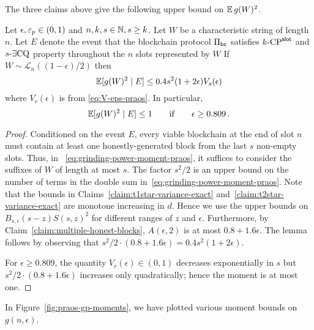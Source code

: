 The three claims above give the following upper bound on $\operatorname{\mathbb{E}} g(W)^2$.


\begin{lemma}\label{lemma:grinding-praos-second-moment}
  Let $\epsilon, \mathsf{\varepsilon}_p \in (0, 1)$ and $n, k, s \in \mathbb{N}, s \geq k$. 
  Let $W$ be a characteristic string of length $n$. 
  Let $E$ denote the event that 
  the blockchain protocol $\Pi_\mathsf{bc}$ 
  satisfies ${k}\text{-}\mathrm{CP}^{\mathsf{slot}}$ and ${s}\text{-}\exists\mathrm{CQ}$ property throughout 
  the $n$ slots represented by $W$   
  If $W  \sim \mathcal{L}_n((1 - \epsilon)/2)$ then
  \begin{equation}\label{eq:grinding-praos-second-moment}
    \operatorname{\mathbb{E}}[ g(W)^2 \mid E] 
    \leq 
      0.4 s^2 (1 + 2\epsilon) V_s(\epsilon)
  \end{equation}
  where $V_r(\epsilon)$ is from \eqref{eq:V-eps-praos}. 
  In particular, 
  $$
    \operatorname{\mathbb{E}} [g(W)^2 \mid E] \leq 1
    \qquad \text{if} \qquad \epsilon \geq 0.809\,.
  $$
\end{lemma}
\noindent
\begin{proof}
  Conditioned on the event $E$, 
  every viable blockchain at the end of slot $n$ 
  must contain at least one honestly-generated block from the last $s$ 
  non-empty slots.
  Thus, 
  in ~\eqref{eq:grinding-power-moment-praos}, 
  it suffices to consider the suffixes of $W$ of length at most $s$. 
  The factor $s^2/2$ is an upper bound on 
  the number of terms in the double sum in~\eqref{eq:grinding-power-moment-praos}. 
  Note that the bounds in 
  Claims~\ref{claim:t1star-variance-exact} 
  and~\ref{claim:t2star-variance-exact} are monotone increasing in $d$. 
  Hence we use the upper bounds on $B_{s, \epsilon}(s-z) S(s,z)^2$ for 
  different ranges of $z$ and $\epsilon$. 
  Furthermore, by Claim~\ref{claim:multiple-honest-blocks}, 
  $A(\epsilon, 2)$ is at most $0.8 + 1.6 \epsilon$. 
  The lemma follows by observing that $s^2/2 \cdot (0.8 + 1.6 \epsilon) = 0.4 s^2 (1 + 2 \epsilon)$.

  For $\epsilon \geq 0.809$, 
  the quantity $V_r(\epsilon) \in (0,1)$ decreases exponentially in $s$ 
  but $s^2/2 \cdot (0.8 + 1.6 \epsilon)$ increases only quadratically; 
  hence the moment is at most one.

\end{proof}

In Figure~\ref{fig:praos-gp-moments}, 
we have plotted various moment bounds on $g(n,\epsilon)$.

